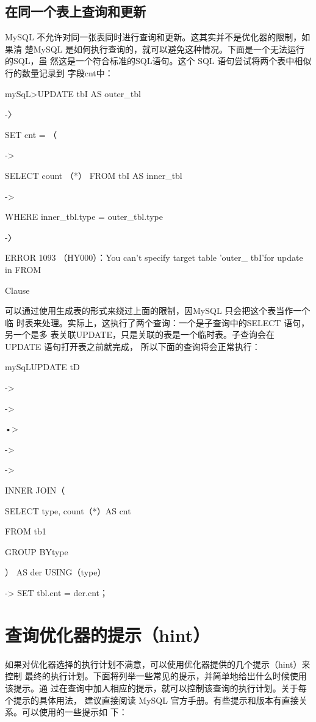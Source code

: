 \subsection{在同一个表上查询和更新}
MySQL 不允许对同一张表同时进行查询和更新。这其实并不是优化器的限制，如果清
楚MySQL 是如何执行查询的，就可以避免这种情况。下面是一个无法运行的SQL，虽
然这是一个符合标准的SQL语句。这个 SQL 语句尝试将两个表中相似行的数量记录到
字段cnt中：

mySqL>UPDATE tbI AS outer\_tbl

-〉

SET cnt = （

->

SELECT count （*） FROM tbI AS inner\_tbl

->

WHERE inner\_tbl.type = outer\_tbl.type

-〉

ERROR 1093 （HY000）：You can't specify target table 'outer\_ tbI'for update in FROM

Clause

可以通过使用生成表的形式来绕过上面的限制，因MySQL 只会把这个表当作一个临
时表来处理。实际上，这执行了两个查询：一个是子查询中的SELECT 语句，另一个是多
表关联UPDATE，只是关联的表是一个临时表。子查询会在 UPDATE 语句打开表之前就完成，
所以下面的查询将会正常执行：

mySqLUPDATE tD

->

->

•>

->

->

INNER JOIN（

SELECT type, count（*）AS cnt

FROM tb1

GROUP BYtype

） AS der USING（type）

-> SET tbl.cnt = der.cnt；

\section{查询优化器的提示（hint）}
如果对优化器选择的执行计划不满意，可以使用优化器提供的几个提示（hint）来控制
最终的执行计划。下面将列举一些常见的提示，并简单地给出什么时候使用该提示。通
过在查询中加人相应的提示，就可以控制该查询的执行计划。关于每个提示的具体用法，
建议直接阅读 MySQL 官方手册。有些提示和版本有直接关系。可以使用的一些提示如
下：

